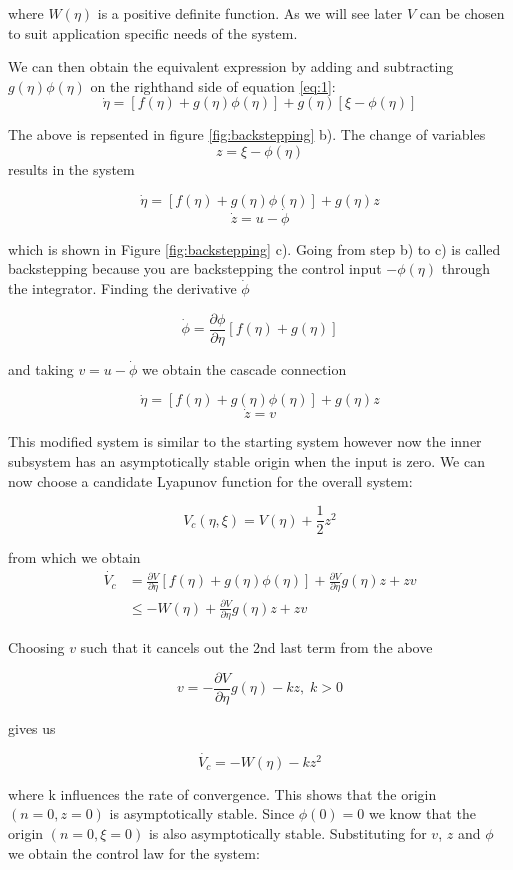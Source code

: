 where $W(\eta)$ is a positive definite function. As we will see later $V$ can be chosen to suit application specific needs of the system.

We can then obtain the equivalent expression by adding and subtracting $g(\eta)\phi(\eta)$ on the righthand side of equation \ref{eq:1}:
\begin{equation}
    \dot{\eta} = [f(\eta) + g(\eta)\phi(\eta)] + g(\eta)[\xi - \phi(\eta)] 
\end{equation}

The above is repsented in figure \ref{fig:backstepping} b). The change of variables 
$$ z = \xi - \phi(\eta) $$
results in the system 

$$ \dot{\eta} = [f(\eta) + g(\eta)\phi(\eta)] + g(\eta)z  $$
$$ \dot{z} = u - \dot{\phi} $$

which is shown in Figure \ref{fig:backstepping} c). Going from step b) to c) is called backstepping because you are backstepping the control input $-\phi(\eta)$ through the integrator. Finding the derivative $\dot{\phi}$ 

$$ \dot{\phi} = \frac{\partial \phi}{\partial \eta} [f(\eta) + g(\eta)] $$

and taking $v = u - \dot{\phi}$ we obtain the cascade connection

$$ \dot{\eta} = [f(\eta) + g(\eta)\phi(\eta)] + g(\eta)z  $$
$$ \dot{z} = v $$

This modified system is similar to the starting system however now the inner subsystem has an asymptotically stable origin when the input is zero. We can now choose a candidate Lyapunov function for the overall system:

$$ V_c (\eta,\xi) = V(\eta) + \frac{1}{2}z^2 $$

from which we obtain
\begin{align}
    \dot{V_c} &= \frac{\partial V}{\partial \eta}[f(\eta) + g(\eta)\phi(\eta)] + \frac{\partial V}{\partial \eta}g(\eta)z + zv \\
    &\leq -W(\eta) + \frac{\partial V}{\partial \eta}g(\eta)z + zv
\end{align}

Choosing $v$ such that it cancels out the 2nd last term from the above

$$ v = -\frac{\partial V}{\partial \eta}g(\eta) - kz, \; k > 0 $$

gives us

$$ \dot{V_c} = -W(\eta) - kz^2 $$

where k influences the rate of convergence.
This shows that the origin $(n=0, z=0)$ is asymptotically stable. Since $\phi(0) = 0$ we know that the origin $(n=0, \xi=0)$ is also asymptotically stable. Substituting for $v$, $z$ and $\phi$ we obtain the control law for the system:

